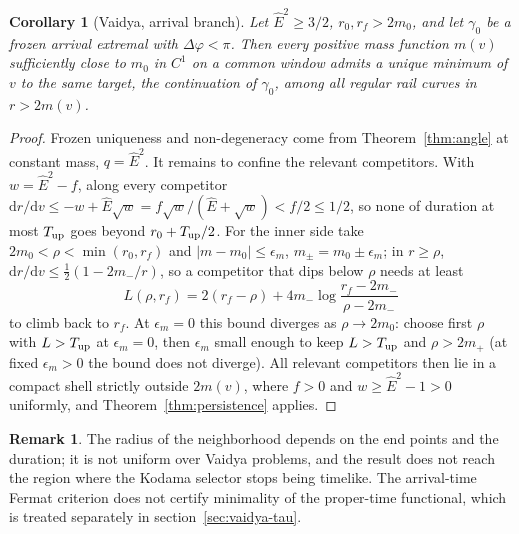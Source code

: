 \documentclass[aip,jmp,amsmath,amssymb,reprint]{revtex4-2}
\newcommand{\Ehat}{\hat E}
\newcommand{\dd}{\mathrm{d}}
\theoremstyle{plain}
\newtheorem{corollary}[proposition]{Corollary}
\theoremstyle{definition}
\newtheorem{remark}[proposition]{Remark}
\begin{document}
\begin{corollary}[Vaidya, arrival branch]\label{cor:vaidya}
Let $\Ehat^2\ge3/2$, $r_0,r_f>2m_0$, and let $\gamma_0$ be a frozen arrival extremal with
$\Delta\varphi<\pi$. Then every positive mass function $m(v)$ sufficiently close to $m_0$ in
$C^1$ on a common window admits a unique minimum of $v$ to the same target, the continuation
of $\gamma_0$, among all regular rail curves in $r>2m(v)$.
\end{corollary}

\begin{proof}
Frozen uniqueness and non-degeneracy come from Theorem~\ref{thm:angle} at constant mass, $q=\Ehat^2$. It remains to
confine the relevant competitors. With $w=\Ehat^2-f$, along every competitor
$\dd r/\dd v\le-w+\Ehat\sqrt w=f\sqrt w/(\Ehat+\sqrt w)<f/2\le1/2$, so none of duration at
most $T_{\rm up}$ goes beyond $r_0+T_{\rm up}/2$. For the inner side take
$2m_0<\rho<\min(r_0,r_f)$ and $|m-m_0|\le\epsilon_m$, $m_\pm=m_0\pm\epsilon_m$; in $r\ge\rho$,
$\dd r/\dd v\le\frac12(1-2m_-/r)$, so a competitor that dips below $\rho$ needs at least
\[
  L(\rho,r_f)=2(r_f-\rho)+4m_-\log\frac{r_f-2m_-}{\rho-2m_-}
\]
to climb back to $r_f$. At $\epsilon_m=0$ this bound diverges as $\rho\to2m_0$: choose first $\rho$
with $L>T_{\rm up}$ at $\epsilon_m=0$, then $\epsilon_m$ small enough to keep $L>T_{\rm up}$ and
$\rho>2m_+$ (at fixed $\epsilon_m>0$ the bound does not diverge). All relevant competitors then lie in a compact shell strictly outside
$2m(v)$, where $f>0$ and $w\ge\Ehat^2-1>0$ uniformly, and Theorem~\ref{thm:persistence}
applies.
\end{proof}

\begin{remark}
The radius of the neighborhood depends on the end points and the duration; it is not
uniform over Vaidya problems, and the result does not reach the region where the Kodama
selector stops being timelike. The arrival-time Fermat criterion does not certify minimality
of the proper-time functional, which is treated separately in section~\ref{sec:vaidya-tau}.
\end{remark}

\end{document}
